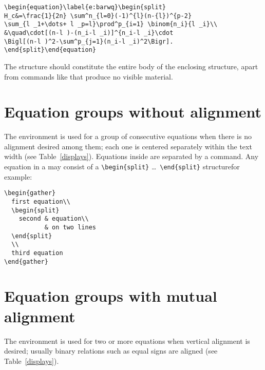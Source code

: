 \documentclass[leqno,titlepage,openany]{amsldoc}[1999/12/13]
\begin{document}
\begin{verbatim}
\begin{equation}\label{e:barwq}\begin{split}
H_c&=\frac{1}{2n} \sum^n_{l=0}(-1)^{l}(n-{l})^{p-2}
\sum_{l _1+\dots+ l _p=l}\prod^p_{i=1} \binom{n_i}{l _i}\\
&\quad\cdot[(n-l )-(n_i-l _i)]^{n_i-l _i}\cdot
\Bigl[(n-l )^2-\sum^p_{j=1}(n_i-l _i)^2\Bigr].
\end{split}\end{equation}
\end{verbatim}

The  structure should constitute the entire body of the
enclosing structure, apart from commands like  that produce no
visible material.

\section{Equation groups without alignment}

The  environment is used for a group of consecutive
equations when there is no alignment desired among them; each one is
centered separately within the text width (see Table~\ref{displays}).
Equations inside  are separated by a \cn{\\} command.
Any equation in a  may consist of a \verb'\begin{split}'
  \dots\ \verb'\end{split}' structure\mdash for example:
\begin{verbatim}
\begin{gather}
  first equation\\
  \begin{split}
    second & equation\\
           & on two lines
  \end{split}
  \\
  third equation
\end{gather}
\end{verbatim}

\section{Equation groups with mutual alignment}

The  environment is used for two or more equations when
vertical alignment is desired; usually binary relations such as equal
signs are aligned (see Table~\ref{displays}).
\end{document}
